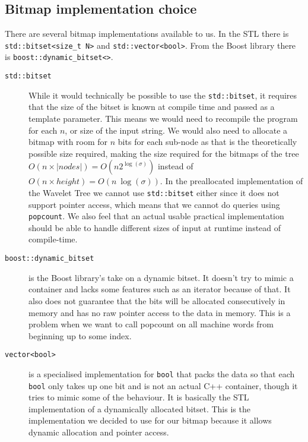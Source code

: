 \subsection{Bitmap implementation choice}
There are several bitmap implementations available to us. In the STL there is \texttt{std::bitset<size\_t N>} and \texttt{std::vector<bool>}. From the Boost library there is \texttt{boost::dynamic\_bitset<>}.
\begin{description}
\item[\texttt{std::bitset}] While it would technically be possible to use the \texttt{std::bitset}, it requires that the size of the bitset is known at compile time and passed as a template parameter. This means we would need to recompile the program for each $n$, or size of the input string. 
We would also need to allocate a bitmap with room for $n$ bits for each sub-node as that is the theoretically possible size required, making the size required for the bitmaps of the tree $O(n \times |nodes|) = O(n2^{\log(\sigma)})$ instead of $O(n \times height) = O(n~\log(\sigma))$.
In the preallocated implementation of the Wavelet Tree we cannot use \texttt{std::bitset} either since it does not support pointer access, which means that we cannot do queries using \texttt{popcount}.
We also feel that an actual usable practical implementation should be able to handle different sizes of input at runtime instead of compile-time. 

\item[\texttt{boost::dynamic\_bitset}] is the Boost library's take on a dynamic bitset. 
It doesn't try to mimic a container and lacks some features such as an iterator because of that. 
It also does not guarantee that the bits will be allocated consecutively in memory and has no raw pointer access to the data in memory. 
This is a problem when we want to call popcount on all machine words from beginning up to some index.

\item[\texttt{vector<bool>}] is a specialised implementation for \texttt{bool} that packs the data so that each \texttt{bool} only takes up one bit and is not an actual C++ container, though it tries to mimic some of the behaviour. 
It is basically the STL implementation of a dynamically allocated bitset. This is the implementation we decided to use for our bitmap because it allows dynamic allocation and pointer access.
\end{description}

